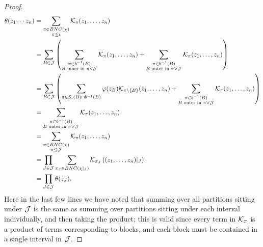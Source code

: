 \begin{proof}
	\begin{align*}
		\theta(z_1\cdots z_n)
		&= \sum_{\substack{\pi\in BNC(\chi)\\ \pi\leq \iota}} \mathcal{K}_\pi(z_1, \ldots, z_n)\\
		&= \sum_{B \in \mathcal{J}}\left(\sum_{\substack{\pi\in b^{-1}(B)\\ B \text{ inner in } \pi\vee\mathcal{J}}}\mathcal{K}_\pi(z_1, \ldots, z_n) + \sum_{\substack{\pi\in b^{-1}(B)\\ B \text{ outer in } \pi\vee\mathcal{J}}}\mathcal{K}_\pi(z_1, \ldots, z_n)\right)\\
		&= \sum_{B\in\mathcal{J}} \left(\sum_{\pi \in S_i(B) \cap b^{-1}(B)} \varphi(z_B)\mathcal{K}_{\pi\setminus\left\{B\right\}}(z_1, \ldots, z_n) + \sum_{\substack{\pi\in b^{-1}(B)\\ B \text{ outer in } \pi\vee\mathcal{J}}}\mathcal{K}_\pi(z_1, \ldots, z_n)\right)\\
		&= \sum_{\substack{\pi\in b^{-1}(B)\\ B \text{ outer in } \pi\vee\mathcal{J}}}\mathcal{K}_\pi(z_1, \ldots, z_n)\\
		&= \sum_{\substack{\pi \in BNC(\chi)\\\pi\leq\mathcal{J}}} \mathcal{K}_\pi(z_1, \ldots, z_n)\\
		&= \prod_{J\in\mathcal{J}}\sum_{\pi_J \in BNC(\chi|_J)} \mathcal{K}_{\pi_J}\left((z_1, \ldots, z_n)|_J\right)\\
		&= \prod_{J\in\mathcal{J}}\theta(z_J).
	\end{align*}
	Here in the last few lines we have noted that summing over all partitions sitting under $\mathcal{J}$ is the same as summing over partitions sitting under each interval individually, and then taking the product; this is valid since every term in $\mathcal{K}_\pi$ is a product of terms corresponding to blocks, and each block must be contained in a single interval in $\mathcal{J}$.
\end{proof}


